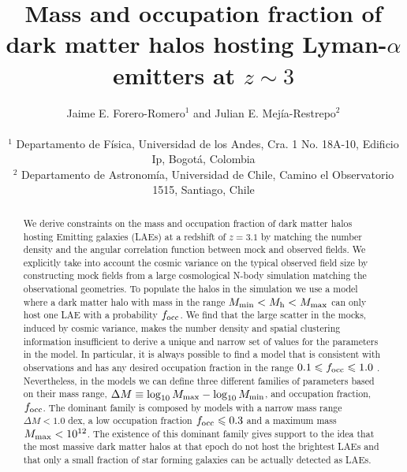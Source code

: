 \documentclass[usenatbib]{mn2e}
\newcommand{\ly}{{\ifmmode{{\rm Ly}\alpha}\else{Ly$\alpha$~}\fi}}
\newcommand{\hMsun}{{\ifmmode{h^{-1}{\rm
        {M_{\odot}}}}\else{$h^{-1}{\rm{M_{\odot}}}$}\fi}}
\begin{document}
\title[Halo mass and occupation fraction for LAEs at
  $z=3.1$]{Mass and occupation
  fraction of dark matter halos hosting Lyman-$\alpha$ emitters
  at $z\sim 3$}    
\author[~J.~E. Forero-Romero and ~J.~E Mejia-Restreo]{
\parbox[t]{\textwidth}{\raggedright 
  Jaime E. Forero-Romero$^{1}$ and
  Julian E. Mej\'ia-Restrepo$^{2}$ 
}
\vspace*{6pt}\\
$^{1}$ Departamento de F\'{i}sica, Universidad de los Andes, Cra. 1
No. 18A-10, Edificio Ip, Bogot\'a, Colombia \\
$^{2}$ Departamento de Astronom\'{i}a, Universidad de Chile, Camino el
Observatorio 1515, Santiago, Chile} 

\maketitle

\begin{abstract}
%
We derive constraints on the mass and occupation fraction of dark
matter halos hosting \ly Emitting galaxies (LAEs) at a redshift of
$z=3.1$ by matching the number density and the angular
correlation function between mock and observed fields. We explicitly
take into account the cosmic variance on the typical observed field size by
constructing mock fields from a large cosmological N-body
simulation matching the observational geometries. To populate the
halos in the simulation we use a model where a dark matter halo with
mass in the range $M_{\rm   min}<M_{\rm h}<M_{\rm max}$ can only host one LAE with a
probability $f_{\rm occ}$. We find that the large scatter in the mocks, induced by
cosmic variance, makes the number density and spatial clustering
information insufficient to derive a unique and narrow set of values
for the parameters in the model. In particular, it is always possible
to find a model that is consistent with observations and has any
desired occupation fraction in the range $0.1\leq f_{\rm occ}\leq 1.0$
.  Nevertheless, in the models we can define three different families
of parameters based on their mass range, $\Delta M \equiv
\log_{10}M_{\rm max} - \log_{10} M_{\rm min}$, and occupation fraction,
$f_{\rm occ}$. The dominant family is composed by models with a narrow
mass range $\Delta M<1.0$ dex, a low occupation fraction $f_{\rm
  occ}\leq 0.3$ and a maximum mass $M_{\rm  max}< 10^{12}$\hMsun.  The
existence of this dominant family gives support to the idea that the
most massive dark matter halos at that epoch do not host the brightest
LAEs and that only a small fraction of star forming galaxies can be
actually detected as LAEs.
\end{abstract}
\end{document}
